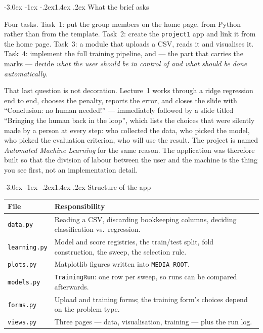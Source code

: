 \documentclass[11pt,a4paper]{article}
\makeatletter
\renewcommand\subsection{\@startsection{subsection}{2}{\z@}%
  {-3.0ex \@plus -1ex \@minus -.2ex}{1.4ex \@plus .2ex}%
  {\normalfont\large\sffamily\bfseries\color{accent}}}
\newcommand{\file}[1]{\texttt{\small #1}}
\makeatother
\begin{document}
\subsection{What the brief asks}

Four tasks. Task~1: put the group members on the home page, from Python rather
than from the template. Task~2: create the \file{project1} app and link it from
the home page. Task~3: a module that uploads a CSV, reads it and visualises it.
Task~4: implement the full training pipeline, and --- the part that carries the
marks --- decide \emph{what the user should be in control of and what should be
done automatically}.

That last question is not decoration. Lecture~1 works through a ridge regression
end to end, chooses the penalty, reports the error, and closes the slide with
``Conclusion: no human needed!'' --- immediately followed by a slide
titled ``Bringing the human back in the loop'', which lists the choices that were
silently made by a person at every step: who collected the data, who picked the
model, who picked the evaluation criterion, who will use the result. The project
is named \emph{Automated Machine Learning} for the same reason. The application
was therefore built so that the division of labour between the user and the
machine is the thing you see first, not an implementation detail.

\subsection{Structure of the app}

\begin{center}
\begin{tabularx}{0.94\textwidth}{@{}lX@{}}
\toprule
\textbf{File} & \textbf{Responsibility} \\
\midrule
\file{data.py}     & Reading a CSV, discarding bookkeeping columns, deciding classification vs.\ regression. \\
\file{learning.py} & Model and score registries, the train/test split, fold construction, the sweep, the selection rule. \\
\file{plots.py}    & Matplotlib figures written into \file{MEDIA\_ROOT}. \\
\file{models.py}   & \texttt{TrainingRun}: one row per sweep, so runs can be compared afterwards. \\
\file{forms.py}    & Upload and training forms; the training form's choices depend on the problem type. \\
\file{views.py}    & Three pages --- data, visualisation, training --- plus the run log. \\
\bottomrule
\end{tabularx}
\end{center}
\end{document}
